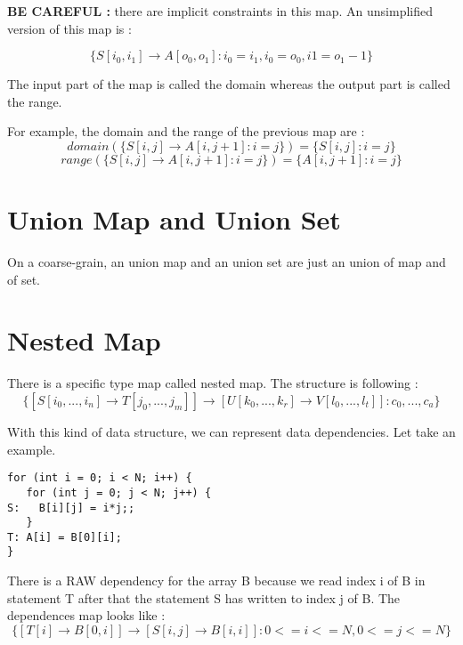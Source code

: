 \textbf{BE CAREFUL :} there are implicit constraints in this map. An unsimplified version of this map is :

\[
\{S[i_0,i_1] \rightarrow A[o_0,o_1]:i_0=i_1,i_0=o_0,i1=o_1−1\}
\]

The input part of the map is called the domain whereas the output part is called the range. 

For example, the domain and the range of the previous map are :
\[
domain(\{S[i,j]→A[i,j+1]:i=j\})=\{S[i,j]:i=j\} 
\]
\[
range(\{S[i,j]→A[i,j+1]:i=j\})=\{A[i,j+1]:i=j\}
\]

\section{Union Map and Union Set}
On a coarse-grain, an union map and an union set are just an union of map and of set.

\section{Nested Map}
There is a specific type map called nested map. The structure is following : 
\[
\{[S[i_0,...,i_n] \rightarrow T[j_0,...,j_m]] \rightarrow [U[k_0,...,k_r] \rightarrow V[l_0,...,l_t]]:c_0,...,c_a\}
\]

With this kind of data structure, we can represent data dependencies. Let take an example.

\begin{lstlisting}[frame=single]
for (int i = 0; i < N; i++) {
   for (int j = 0; j < N; j++) {
S:   B[i][j] = i*j;;
   }
T: A[i] = B[0][i];
}
\end{lstlisting}

There is a RAW dependency for the array B because we read index i of B in statement T after that the statement S has written to index j of B. The dependences map looks like :
\[
\{[T[i] \rightarrow B[0,i]] \rightarrow [S[i,j] \rightarrow B[i,i]]:0<=i<=N,0<=j<=N\}
\]

